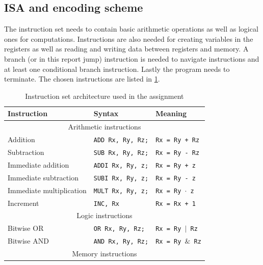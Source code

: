 \documentclass[a4paper, english]{article}
\numberwithin{equation}{section}
\begin{document}
\subsection{ISA and encoding scheme}\label{sec:isa}
The instruction set needs to contain basic arithmetic operations as well as logical ones for computations. Instructions are also needed for creating variables in the registers as well as reading and writing data between registers and memory. A branch (or in this report jump) instruction is needed to navigate instructions and at least one conditional branch instruction. Lastly the program needs to terminate. The chosen instructions are listed in \cref{tbl:ISA}.
\begin{table}
    \centering
    \caption{Instruction set architecture used in the assignment}\label{tbl:ISA}
    \begin{tabular}{lll}
        \toprule
        \textbf{Instruction}     & \textbf{Syntax}          & \textbf{Meaning}                 \\
        \midrule
        \multicolumn{3}{c}{Arithmetic instructions}                                            \\
        \midrule
        Addition                 & \texttt{ADD Rx, Ry, Rz;} & \texttt{Rx = Ry + Rz}            \\
        Subtraction              & \texttt{SUB Rx, Ry, Rz;} & \texttt{Rx = Ry - Rz}            \\
        Immediate addition       & \texttt{ADDI Rx, Ry, z;} & \texttt{Rx = Ry + z}             \\
        Immediate subtraction    & \texttt{SUBI Rx, Ry, z;} & \texttt{Rx = Ry - z}             \\
        Immediate multiplication & \texttt{MULT Rx, Ry, z;} & \texttt{Rx = Ry \(\cdot\) z}     \\
        Increment                & \texttt{INC, Rx}         & \texttt{Rx = Rx + 1}             \\
        \midrule
        \multicolumn{3}{c}{Logic instructions}                                                 \\
        \midrule
        Bitwise OR               & \texttt{OR Rx, Ry, Rz;}  & \texttt{Rx = Ry \(\vert\) Rz}    \\
        Bitwise AND              & \texttt{AND Rx, Ry, Rz;} & \texttt{Rx = Ry \(\&\) Rz}       \\
        \midrule
        \multicolumn{3}{c}{Memory instructions}                                                \\

\end{tabular}
\end{table}
\end{document}
